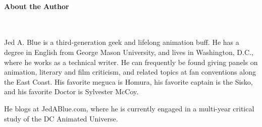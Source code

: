 \paragraph{About the Author}~{}

Jed A. Blue is a third-generation geek and lifelong animation buff. He has a degree in English from George Mason University, and lives in Washington, D.C., where he works as a technical writer. He can frequently be found giving panels on animation, literary and film criticism, and related topics at fan conventions along the East Coast. His favorite meguca is Homura, his favorite captain is the Sisko, and his favorite Doctor is Sylvester McCoy.

He blogs at JedABlue.com, where he is currently engaged in a multi-year critical study of the DC Animated Universe.
